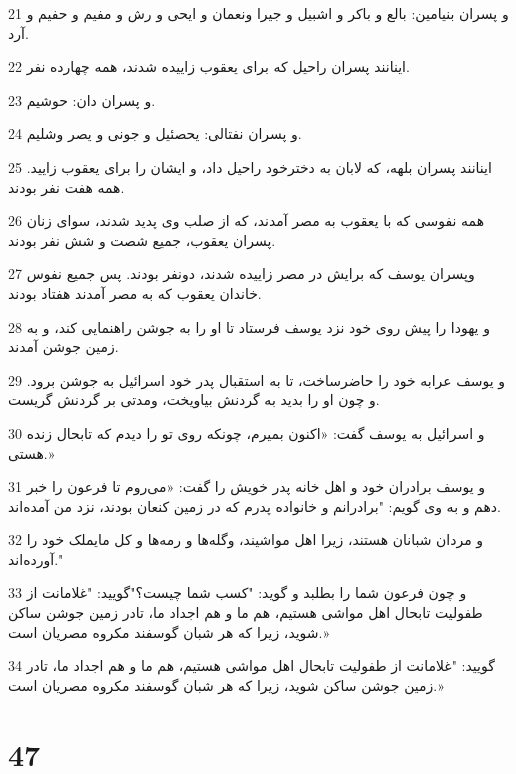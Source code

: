 \par 21 و پسران بنیامین: بالع و باکر و اشبیل و جیرا ونعمان و ایحی و رش و مفیم و حفیم و آرد.
\par 22 اینانند پسران راحیل که برای یعقوب زاییده شدند، همه چهارده نفر.
\par 23 و پسران دان: حوشیم.
\par 24 و پسران نفتالی: یحصئیل و جونی و یصر وشلیم.
\par 25 اینانند پسران بلهه، که لابان به دخترخود راحیل داد، و ایشان را برای یعقوب زایید. همه هفت نفر بودند.
\par 26 همه نفوسی که با یعقوب به مصر آمدند، که از صلب وی پدید شدند، سوای زنان پسران یعقوب، جمیع شصت و شش نفر بودند.
\par 27 وپسران یوسف که برایش در مصر زاییده شدند، دونفر بودند. پس جمیع نفوس خاندان یعقوب که به مصر آمدند هفتاد بودند.
\par 28 و یهودا را پیش روی خود نزد یوسف فرستاد تا او را به جوشن راهنمایی کند، و به زمین جوشن آمدند.
\par 29 و یوسف عرابه خود را حاضرساخت، تا به استقبال پدر خود اسرائیل به جوشن برود. و چون او را بدید به گردنش بیاویخت، ومدتی بر گردنش گریست.
\par 30 و اسرائیل به یوسف گفت: «اکنون بمیرم، چونکه روی تو را دیدم که تابحال زنده هستی.»
\par 31 و یوسف برادران خود و اهل خانه پدر خویش را گفت: «می‌روم تا فرعون را خبر دهم و به وی گویم: "برادرانم و خانواده پدرم که در زمین کنعان بودند، نزد من آمده‌اند.
\par 32 و مردان شبانان هستند، زیرا اهل مواشیند، وگله‌ها و رمه‌ها و کل مایملک خود را آورده‌اند."
\par 33 و چون فرعون شما را بطلبد و گوید: "کسب شما چیست؟"گویید: "غلامانت از طفولیت تابحال اهل مواشی هستیم، هم ما و هم اجداد ما، تادر زمین جوشن ساکن شوید، زیرا که هر شبان گوسفند مکروه مصریان است.»
\par 34 گویید: "غلامانت از طفولیت تابحال اهل مواشی هستیم، هم ما و هم اجداد ما، تادر زمین جوشن ساکن شوید، زیرا که هر شبان گوسفند مکروه مصریان است.»
 
\chapter{47}

